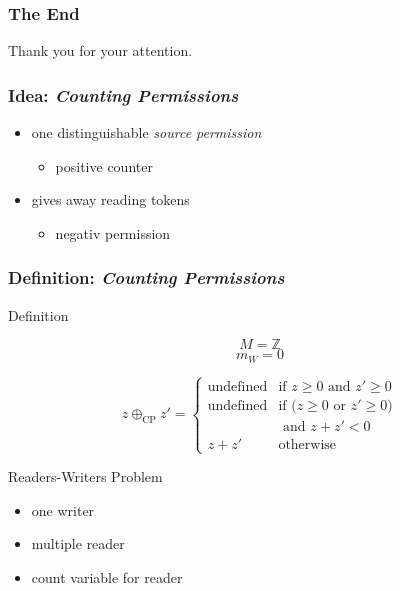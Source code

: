 \documentclass{beamer}
\begin{document}
	\begin{frame}
		\frametitle{The End}
		\begin{center}
			\huge{Thank you for your attention.}
		\end{center}
	\end{frame}

	\begin{frame}
	\frametitle{Idea: \emph{Counting Permissions}}
	\begin{itemize}
		\item one distinguishable \emph{source permission}
		\begin{itemize}
		\item positive counter
		\end{itemize}
		\item gives away reading tokens
		\begin{itemize}
			\item negativ permission
		\end{itemize}
	\end{itemize}
	\end{frame}

	\begin{frame}[noframenumbering]
	\frametitle{Definition: \emph{Counting Permissions}}
		\begin{block}{Definition}
			\begin{minipage}{0.25\textwidth}
				$$M = \mathbb{Z}$$
				$$m_W = 0$$
			\end{minipage}\noindent
			\begin{minipage}{0.75\textwidth}
				$$z\oplus_\text{CP} z' =
					\begin{cases}
						\text{undefined} & \text{if $z \geq 0$ and $z' \geq 0$}\\
						\text{undefined} & \text{if ($z\geq 0$ or  $z' \geq 0$)}\\
						                 & \text{ and $z + z' < 0$}\\
						z + z'           & \text{otherwise}
					\end{cases}
				$$
			\end{minipage}
		\end{block}
		\begin{exampleblock}{Readers-Writers Problem}
			\begin{itemize}
				\item one writer
				\item multiple reader
				\item count variable for reader
			\end{itemize}
		\end{exampleblock}
	\end{frame}
\end{document}
